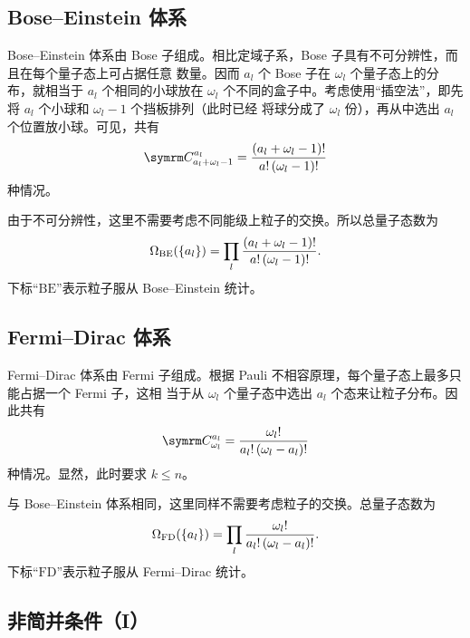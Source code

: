 \subsection{Bose--Einstein 体系} \label{subsec:bose-einstein-system}

Bose--Einstein 体系由 Bose 子组成。相比定域子系，Bose 子具有不可分辨性，而且在每个量子态上可占据任意
数量。因而 $a_l$ 个 Bose 子在 $\omega_l$ 个量子态上的分布，就相当于 $a_l$ 个相同的小球放在
$\omega_l$ 个不同的盒子中。考虑使用“插空法”，即先将 $a_l$ 个小球和 $\omega_l-1$ 个挡板排列（此时已经
将球分成了 $\omega_l$ 份），再从中选出 $a_l$ 个位置放小球。可见，共有
\begin{equation}
  \Cnum{a_l+\omega_l-1}{a_l} = \frac{\qty(a_l+\omega_l-1)!}{a! \, \qty(\omega_l-1)!}
\end{equation}
种情况。

由于不可分辨性，这里不需要考虑不同能级上粒子的交换。所以总量子态数为
\begin{equation} \label{eq:Omega-in-bose-dist}
  \Omega_\text{BE}(\qty{a_l}) = \prod_l \frac{\qty(a_l+\omega_l-1)!}{a! \, \qty(\omega_l-1)!}.
\end{equation}
下标“$\text{BE}$”表示粒子服从 Bose--Einstein 统计。

\subsection{Fermi--Dirac 体系}

Fermi--Dirac 体系由 Fermi 子组成。根据 Pauli 不相容原理，每个量子态上最多只能占据一个 Fermi 子，这相
当于从 $\omega_l$ 个量子态中选出 $a_l$ 个态来让粒子分布。因此共有
\begin{equation}
  \Cnum{\omega_l}{a_l} = \frac{\omega_l!}{a_l! \, \qty(\omega_l-a_l)!}
\end{equation}
种情况。显然，此时要求 $k \leqslant n$。

与 Bose--Einstein 体系相同，这里同样不需要考虑粒子的交换。总量子态数为
\begin{equation} \label{eq:Omega-in-fermi-dist}
  \Omega_\text{FD}(\qty{a_l}) = \prod_l \frac{\omega_l!}{a_l! \, \qty(\omega_l-a_l)!}.
\end{equation}
下标“$\text{FD}$”表示粒子服从 Fermi--Dirac 统计。

\subsection{非简并条件（I）} \label{subsec:non-degenerate-condition-i}

